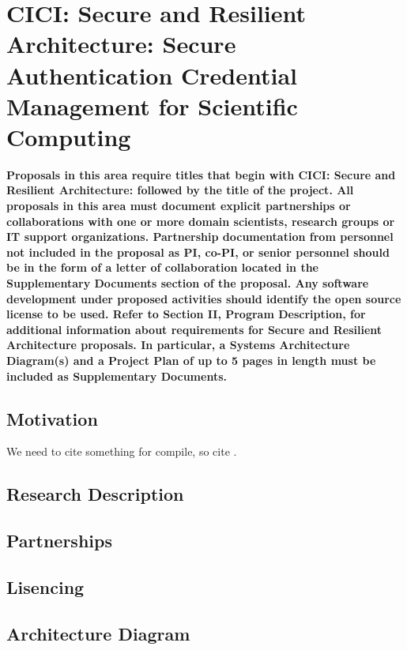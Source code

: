 \documentclass[11pt]{NSF}
\begin{document}
\section{CICI: Secure and Resilient Architecture: Secure Authentication
Credential Management for Scientific Computing}
\textbf{Proposals in this area require titles that begin with CICI: Secure and
Resilient Architecture: followed by the title of the project.  All proposals
in this area must document explicit partnerships or collaborations with one or
more domain scientists, research groups or IT support organizations.
Partnership documentation from personnel not included in the proposal as PI,
co-PI, or senior personnel should be in the form of a letter of collaboration
located in the Supplementary Documents section of the proposal.  Any software
development under proposed activities should identify the open source license
to be used.  Refer to Section II, Program Description, for additional
information about requirements for Secure and Resilient Architecture
proposals. In particular, a Systems Architecture Diagram(s) and a Project Plan
of up to 5 pages in length must be included as Supplementary Documents.}
\subsection{Motivation}
We need to cite something for compile, so cite \cite{GW150914}.
\subsection{Research Description}
\subsection{Partnerships}
\subsection{Lisencing}
\subsection{Architecture Diagram}


\clearpage
  

\end{document}
